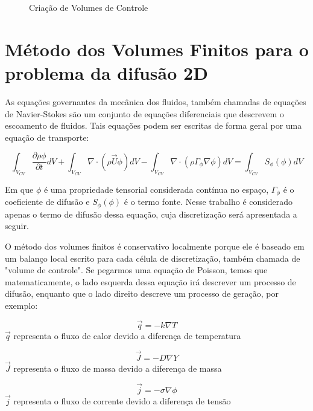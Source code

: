 \begin{figure}[ht]
    \caption{Criação de Volumes de Controle}
    \label{fig:volume-controle}
\end{figure}

\section{Método dos Volumes Finitos para o problema da difusão 2D}

As equações governantes da mecânica dos fluidos, também chamadas de equações de Navier-Stokes são um conjunto de equações diferenciais que descrevem o escoamento de fluidos. Tais equações podem ser escritas de forma geral por uma equação de transporte:

\begin{equation}
    \int_{V_{CV}} \frac{\partial \rho \phi}{\partial t}dV + \int_{V_{CV}} \nabla \cdot (\rho \vec{U}\phi)dV - \int_{V_{CV}} \nabla \cdot (\rho \Gamma_\phi \nabla\phi)dV = \int_{V_{CV}} S_\phi(\phi)dV
\end{equation}

Em que $\phi$ é uma propriedade tensorial considerada contínua no espaço, $\Gamma_\phi$ é o coeficiente de difusão e $S_\phi(\phi)$ é o termo fonte. Nesse trabalho é considerado apenas o termo de difusão dessa equação, cuja discretização será apresentada a seguir.

O método dos volumes finitos é conservativo localmente porque ele é baseado em um balanço local escrito para cada célula de discretização, também chamada de "volume de controle". Se pegarmos uma equação de Poisson, temos que matematicamente, o lado esquerda dessa equação irá descrever um processo de difusão, enquanto que o lado direito descreve um processo de geração, por exemplo:

\begin{equation}
    \vec{q} = -k \nabla T
\end{equation}
$\vec{q}$ representa o fluxo de calor devido a diferença de temperatura

\begin{equation}
    \vec{J} = -D \nabla Y
\end{equation}
$\vec{J}$ representa o fluxo de massa devido a diferença de massa

\begin{equation}             
    \vec{j} = -\sigma \nabla \phi
\end{equation}
$\vec{j}$ representa o fluxo de corrente devido a diferença de tensão

